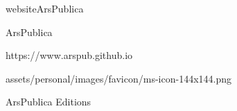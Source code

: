 \E websiteArsPublica

\siteTit ArsPublica

\webAddress https://www.arspub.github.io

\linkImage assets/personal/images/favicon/ms-icon-144x144.png

\pageTitle ArsPublica Editions


